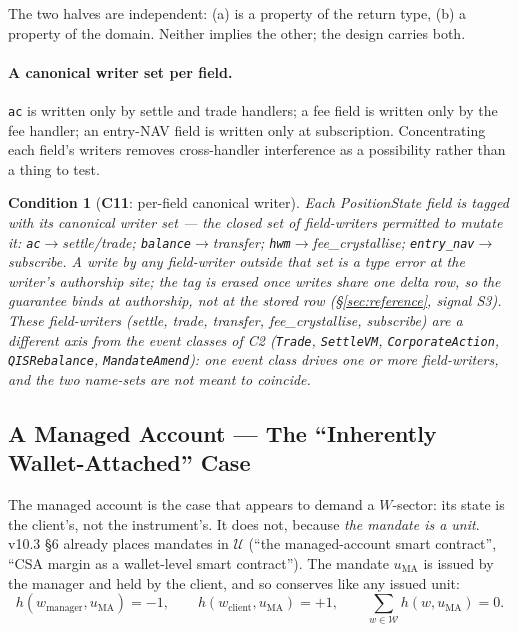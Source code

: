 \documentclass[11pt,a4paper]{article}
\newtheorem{condition}[definition]{Condition}
\begin{document}
\noindent The two halves are independent: (a) is a property of the return type, (b) a
property of the domain. Neither implies the other; the design carries both.

\paragraph{A canonical writer set per field.}
\texttt{ac} is written only by settle and trade handlers; a fee field is written only by the
fee handler; an entry-NAV field is written only at subscription. Concentrating each field's
writers removes cross-handler interference as a possibility rather than a thing to test.

\begin{condition}[\textbf{C11}: per-field canonical writer]
Each \emph{PositionState} field is tagged with its canonical writer set --- the closed set
of field-writers permitted to mutate it: \texttt{ac}$\to$settle/trade;
\texttt{balance}$\to$transfer; \texttt{hwm}$\to$fee\_crystallise;
\texttt{entry\_nav}$\to$subscribe. A write by any field-writer outside that set is a type
error at the writer's authorship site; the tag is erased once writes
share one delta row, so the guarantee binds at authorship, not at the stored row
(\S\ref{sec:reference}, signal S3). These field-writers (settle, trade, transfer,
fee\_crystallise, subscribe) are a different axis from the event classes of C2
(\texttt{Trade}, \texttt{SettleVM}, \texttt{CorporateAction}, \texttt{QISRebalance},
\texttt{MandateAmend}): one event class drives one or more field-writers, and the two
name-sets are not meant to coincide.
\end{condition}

\subsection{A Managed Account --- The ``Inherently Wallet-Attached'' Case}
\label{sec:ma}

The managed account is the case that appears to demand a $W$-sector: its state is the
client's, not the instrument's. It does not, because \emph{the mandate is a unit}. v10.3
\S 6 already places mandates in $\mathcal{U}$ (``the managed-account smart contract'', ``CSA
margin as a wallet-level smart contract''). The mandate $u_{\mathrm{MA}}$ is issued by the
manager and held by the client, and so conserves like any issued unit:
\[
h(w_{\mathrm{manager}},u_{\mathrm{MA}}) = -1,\qquad
h(w_{\mathrm{client}},u_{\mathrm{MA}}) = +1,\qquad
\sum_{w\in\mathcal{W}} h(w,u_{\mathrm{MA}}) = 0.
\]
\end{document}
